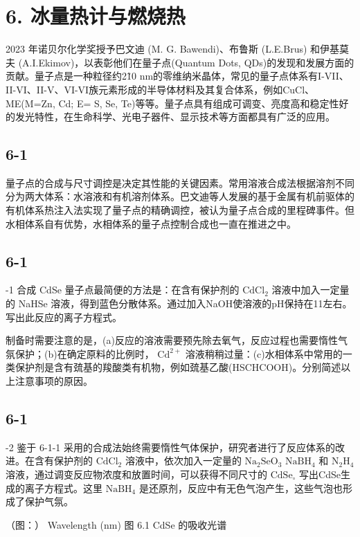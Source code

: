 \section*{6. 冰量热计与燃烧热}
2023 年诺⻉尔化学奖授予巴⽂迪 (M. G. Bawendi)、布鲁斯 (L.E.Brus) 和伊基莫夫 (A.I.Ekimov)，以表彰他们在量⼦点(Quantum Dots, QDs)的发现和发展⽅⾯的贡献。量⼦点是⼀种粒径约2\~10 nm的零维纳⽶晶体，常⻅的量⼦点体系有I-VII、II-VI、II-V、VI-VI族元素形成的半导体材料及其复合体系，例如CuCl、ME(M=Zn, Cd; E= S, Se, Te)等等。量⼦点具有组成可调变、亮度⾼和稳定性好的发光特性，在⽣命科学、光电⼦器件、显⽰技术等⽅⾯都具有⼴泛的应⽤。

\subsection*{6-1}
量⼦点的合成与尺⼨调控是决定其性能的关键因素。常⽤溶液合成法根据溶剂不同分为两⼤体系：⽔溶液和有机溶剂体系。巴⽂迪等⼈发展的基于⾦属有机前驱体的有机体系热注⼊法实现了量⼦点的精确调控，被认为量⼦点合成的⾥程碑事件。但⽔相体系⾃有优势，⽔相体系的量⼦点控制合成也⼀直在推进之中。

\subsection*{6-1}
-1 合成 CdSe 量⼦点最简便的⽅法是：在含有保护剂的 $\mathrm { C d C l _ { 2 } }$ 溶液中加⼊⼀定量的 NaHSe 溶液，得到蓝⾊分散体系。通过加⼊NaOH使溶液的pH保持在11左右。写出此反应的离⼦⽅程式。

制备时需要注意的是，(a)反应的溶液需要预先除去氧⽓，反应过程也需要惰性⽓氛保护；(b)在确定原料的⽐例时， $\mathrm { C d ^ { 2 + } }$ 溶液稍稍过量：(c)⽔相体系中常⽤的⼀类保护剂是含有巯基的羧酸类有机物，例如巯基⼄酸(HSCHCOOH)。分别简述以上注意事项的原因。

\subsection*{6-1}
-2 鉴于 6-1-1 采⽤的合成法始终需要惰性⽓体保护，研究者进⾏了反应体系的改进。在含有保护剂的 $\mathrm { C d C l _ { 2 } }$ 溶液中，依次加⼊⼀定量的 $\mathrm { N a _ { 2 } S e O _ { 3 } }$ $\mathrm { N a B H _ { 4 } }$ 和 $\mathrm { N _ { 2 } H _ { 4 } }$ 溶液，通过调变反应物浓度和放置时间，可以获得不同尺⼨的 ${ \mathrm { C d S e } } _ { \circ }$ 写出CdSe⽣成的离⼦⽅程式。这⾥ $\mathrm { N a B H _ { 4 } }$ 是还原剂，反应中有⽆⾊⽓泡产⽣，这些⽓泡也形成了保护⽓氛。

（图：）
Wavelength (nm)
图 6.1 CdSe 的吸收光谱

